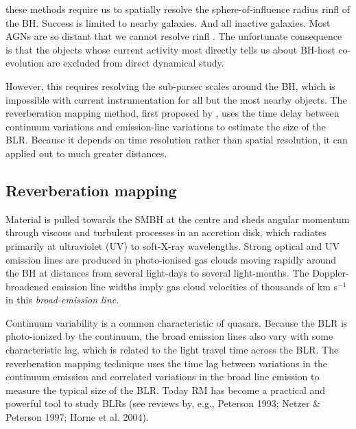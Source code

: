 these methods require us to spatially resolve the sphere-of-influence radius rinfl of the BH. Success is limited to
nearby galaxies. And all inactive galaxies. Most AGNs are so distant that we cannot resolve rinfl .
The unfortunate consequence is that the objects whose current
activity most directly tells us about BH-host co-evolution are excluded from direct dynamical study.


However, this requires resolving the sub-parsec scales around the BH, which is impossible with current instrumentation for all but the most nearby objects.
The reverberation mapping method, first proposed by \citet{blanford82}, uses the time delay between continuum variations and emission-line variations to estimate the size of the BLR. 
Because it depends on time resolution rather than spatial resolution, it can applied out to much greater distances. 

\subsection{Reverberation mapping}

Material is pulled towards the SMBH at the centre and sheds angular momentum through viscous and turbulent processes in an accretion disk, which radiates primarily at ultraviolet (UV) to soft-X-ray wavelengths. 
Strong optical and UV emission lines are produced in photo-ionised gas clouds moving rapidly around the BH at distances from several light-days to several light-months.
The Doppler-broadened emission line widths imply gas cloud velocities of thousands of km s$^{-1}$ in this {\it broad-emission line}. 

Continuum variability is a common characteristic of quasars. 
Because the BLR is photo-ionized by the continuum, the broad emission lines also vary with some characteristic lag, which is related to the light travel time across the BLR. 
The reverberation mapping technique uses the time lag between variations in the continuum emission and correlated variations in the broad line emission to measure the typical size of the BLR. 
Today RM has become a practical and powerful tool to study BLRs (see reviews by, e.g., Peterson 1993; Netzer \& Peterson 1997; Horne et al. 2004). 

